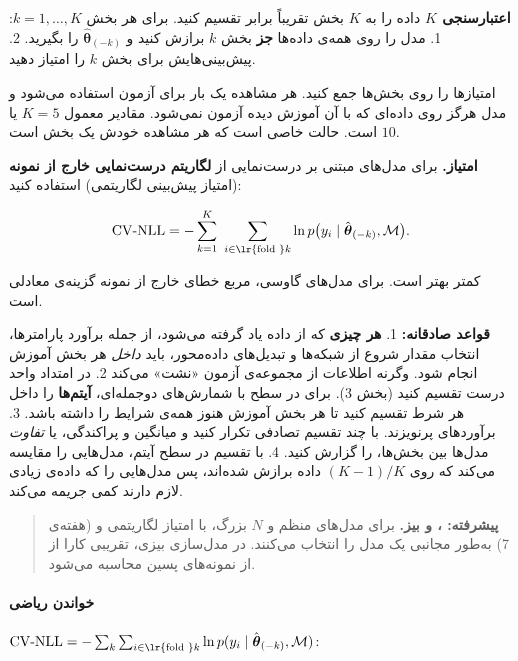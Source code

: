 \textbf{اعتبارسنجی \(K\)} داده را به \(K\) بخش 
تقریباً برابر تقسیم کنید. برای هر بخش \(k = 1, \dots, K\): 1. مدل را روی
همه‌ی داده‌ها \textbf{جز} بخش \(k\) برازش کنید و
\(\hat{\boldsymbol\theta}_{(-k)}\) را بگیرید. 2. پیش‌بینی‌هایش برای بخش
\(k\) را امتیاز دهید.

امتیازها را روی بخش‌ها جمع کنید. هر مشاهده یک بار برای آزمون استفاده
می‌شود و مدل هرگز روی داده‌ای که با آن آموزش دیده آزمون نمی‌شود. مقادیر
معمول \(K = 5\) یا \(10\) است. \textbf{} حالت
خاصی است که هر مشاهده خودش یک بخش است.

\textbf{امتیاز.} برای مدل‌های مبتنی بر درست‌نمایی از \textbf{لگاریتم
درست‌نمایی خارج از نمونه} (امتیاز پیش‌بینی لگاریتمی) استفاده کنید:

\[
\mathrm{CV\text{-}NLL} = -\sum_{k=1}^{K}\ \sum_{i \in \text{\lr{fold }} k} \ln p\big(y_i \mid \hat{\boldsymbol\theta}_{(-k)}, \mathcal{M}\big).
\]

کمتر بهتر است. برای مدل‌های گاوسی، مربع خطای خارج از نمونه گزینه‌ی معادلی
است.

\textbf{قواعد  صادقانه:} 1. \textbf{هر چیزی} که از داده یاد گرفته
می‌شود، از جمله برآورد پارامترها، انتخاب مقدار شروع از شبکه‌ها و تبدیل‌های
داده‌محور، باید \emph{داخل} هر بخش آموزش انجام شود. وگرنه اطلاعات از
مجموعه‌ی آزمون «نشت» می‌کند  2. در امتداد واحد درست
تقسیم کنید (بخش 3). برای  در سطح  با شمارش‌های دوجمله‌ای،
\textbf{آیتم‌ها} را داخل هر شرط تقسیم کنید تا هر بخش آموزش هنوز همه‌ی
شرایط را داشته باشد. 3. برآوردهای  پرنویزند. با چند تقسیم تصادفی
تکرار کنید و میانگین و پراکندگی، یا  \emph{تفاوت} مدل‌ها بین
بخش‌ها، را گزارش کنید. 4. با تقسیم در سطح آیتم،  مدل‌هایی را مقایسه
می‌کند که روی \((K-1)/K\) داده برازش شده‌اند، پس مدل‌هایی را که داده‌ی زیادی
لازم دارند کمی جریمه می‌کند.

\begin{quote}
\textbf{پیشرفته: ،  و بیز.} برای مدل‌های منظم و \(N\)
بزرگ،  با امتیاز لگاریتمی و  (هفته‌ی 7) به‌طور مجانبی یک
مدل را انتخاب می‌کنند. در مدل‌سازی بیزی، تقریبی کارا از  از نمونه‌های پسین محاسبه می‌شود.
\end{quote}

\paragraph{خواندن ریاضی}

\(\mathrm{CV\text{-}NLL} = -\sum_{k}\sum_{i \in \text{\lr{fold }} k} \ln p(y_i \mid \hat{\boldsymbol\theta}_{(-k)}, \mathcal{M})\):

